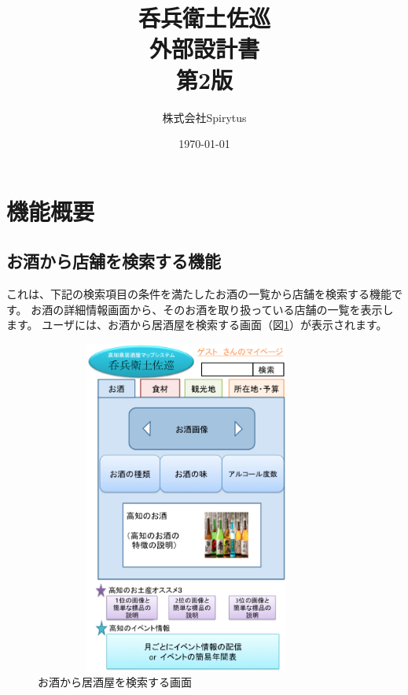 \documentclass[a4j,titlepage]{jarticle}
\title{呑兵衛土佐巡\\
外部設計書\\
第2版}
\author{株式会社Spirytus}
\date{\today}
\begin{document}
\maketitle
\tableofcontents

\clearpage

\section{機能概要}
\subsection{お酒から店舗を検索する機能}
これは、下記の検索項目の条件を満たしたお酒の一覧から店舗を検索する機能です。
お酒の詳細情報画面から、そのお酒を取り扱っている店舗の一覧を表示します。
ユーザには、お酒から居酒屋を検索する画面（図\ref{fig:1}）が表示されます。

\begin {figure}[htbp]
    \begin{center}
    \includegraphics [height=11cm, width=10cm]{extrnal_design_document_image/1.eps}
    \caption {お酒から居酒屋を検索する画面}
    \label {fig:1}
    \end{center}
\end {figure}
\end{document}
